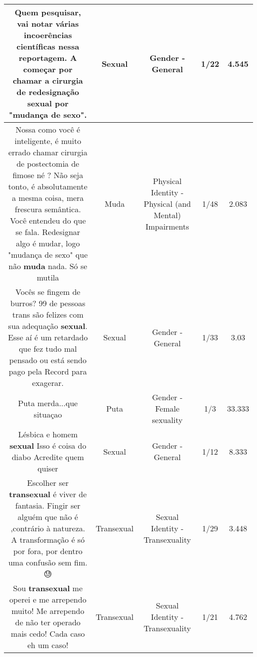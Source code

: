 \documentclass[11pt]{article}
\newlength\mylength
\begin{document}
\begin{center}
\begin{longtable}{|C{.65\mylength}|C{.30\mylength}|C{.12\mylength}|C{.12\mylength}|C{.12\mylength}|}
  \small Quem pesquisar, vai notar várias incoerências científicas nessa reportagem.  A começar por chamar a cirurgia de redesignação \textbf{sexual} por "mudança de sexo".\normalsize   & Sexual & Gender - General & 1/22 & 4.545 \\  \hline
  \small Nossa como você é inteligente, é muito errado chamar cirurgia de postectomia de fimose né ? Não seja tonto, é absolutamente a mesma coisa, mera frescura semântica. Você entendeu do que se fala. Redesignar algo é mudar, logo "mudança de sexo" que não \textbf{muda} nada. Só se mutila\normalsize   & Muda & Physical Identity - Physical (and Mental) Impairments & 1/48 & 2.083 \\  \hline
  \small Vocês se fingem de burros? 99 de pessoas trans são felizes com sua adequação \textbf{sexual}. Esse aí é um retardado que fez tudo mal pensado ou está sendo pago pela Record para exagerar.\normalsize   & Sexual & Gender - General & 1/33 & 3.03 \\  \hline
  \small Puta merda...que situaçao\normalsize   & Puta & Gender - Female sexuality & 1/3 & 33.333 \\  \hline
  \small Lésbica e homem \textbf{sexual} Isso é coisa do diabo Acredite quem quiser\normalsize   & Sexual & Gender - General & 1/12 & 8.333 \\  \hline
  \small Escolher ser \textbf{transexual} é viver de fantasia. Fingir ser alguém que não é ,contrário à natureza. A transformação é só por fora, por dentro uma confusão sem fim. 😓\normalsize   & Transexual & Sexual Identity - Transexuality & 1/29 & 3.448 \\  \hline
  \small Sou \textbf{transexual} me operei e me arrependo muito! Me arrependo de não ter operado mais cedo! Cada caso eh um caso!\normalsize   & Transexual & Sexual Identity - Transexuality & 1/21 & 4.762 \\  \hline

\end{longtable}
\end{center}
\end{document}
